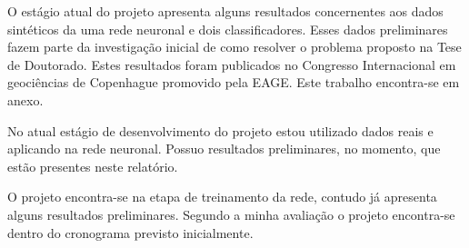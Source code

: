 O estágio atual do projeto apresenta alguns resultados concernentes aos dados sintéticos da uma rede neuronal e dois classificadores. Esses dados preliminares fazem parte da investigação inicial de como resolver o problema proposto na Tese de Doutorado. Estes resultados foram publicados no Congresso Internacional em geociências de Copenhague promovido pela EAGE. Este trabalho encontra-se em anexo. 

No atual estágio de desenvolvimento do projeto estou utilizado dados reais e aplicando na rede neuronal. Possuo resultados preliminares, no momento, que estão presentes neste relatório. 

\begin{table}[H]
	\centering
	
	\begin{small}
		
		\setlength{\tabcolsep}{2pt}
		
	\end{small}
	\caption{Cronograma das atividades previstas para o segundo biênio.}
	\label{t2_cronograma}
\end{table}

O projeto encontra-se na etapa de treinamento da rede, contudo já apresenta alguns resultados preliminares. Segundo a minha avaliação o projeto encontra-se dentro do cronograma previsto inicialmente. 